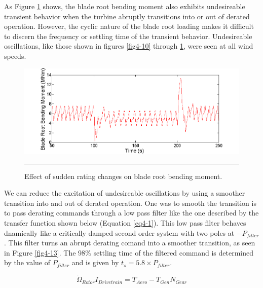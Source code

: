 As Figure \ref{fig4-12} shows, the blade root bending moment also exhibits undesireable transient behavior when the turbine abruptly transitions into or out of derated operation. However, the cyclic nature of the blade root loading makes it difficult to discern the frequency or settling time of the transient behavior. Undesireable oscillations, like those shown in figures \ref{fig4-10} through \ref{fig4-12}, were seen at all wind speeds.

\begin{figure}[htbp]
	\centering
		\includegraphics[trim = {1cm 0 2cm 0}, clip, width = \linewidth]{Figures/ch4Figures/fig4-12.png}
		\rule{35em}{0.5pt}
	\caption{Effect of sudden rating changes on blade root bending moment.}
	\label{fig4-12}
\end{figure}

We can reduce the excitation of undesireable oscillations by using a smoother transition into and out of derated operation. One was to smooth the transition is to pass derating commands through a low pass filter like the one described by the transfer function shown below (Equation \ref{eq4-1}). This low pass filter behaves dnamically like a critically damped second order system with two poles at $-P_{filter}$. This filter turns an abrupt derating comand into a smoother transition, as seen in Figure \ref{fig4-13}. The 98$\%$ settling time of the filtered command is determined by the value of $P_{filter}$ and is given by $t_s = 5.8\times P_{filter}$.

\begin{equation}
	\dot{\Omega }_{Rotor}I_{Drivetrain}=T_{Aero}-T_{Gen}N_{Gear} \label{eq4-1}
\end{equation}


